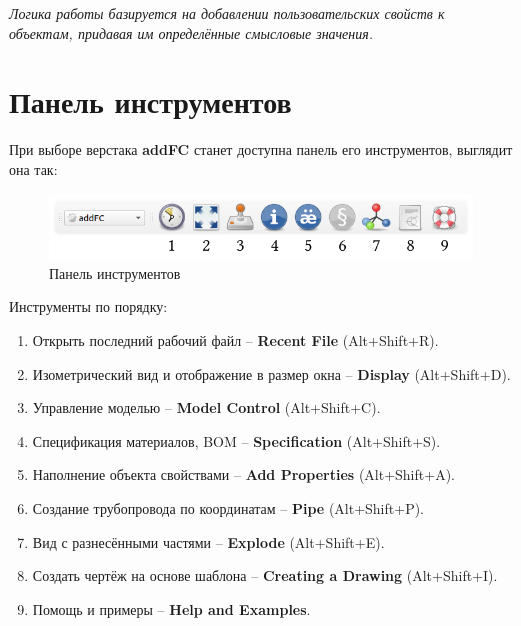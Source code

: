 \documentclass[a4paper,12pt]{article}
\begin{document}
\begin{center}\emph{Логика работы базируется на добавлении пользовательских свойств к объектам, придавая им определённые смысловые значения.}\end{center}





\section{Панель инструментов}

При выборе верстака \textbf{addFC} станет доступна панель его инструментов, выглядит она так:

\begin{figure}[htp]
	\centering
	\includegraphics[scale=0.8]{img/toolbar.png}
	\caption{Панель инструментов}
	\label{sec:toolbar}
\end{figure}

\begin{flushleft}Инструменты по порядку:\end{flushleft}
\begin{enumerate}
	\item Открыть последний рабочий файл -- \textbf{Recent File} (Alt+Shift+R).\label{sec:1}
	\item Изометрический вид и отображение в размер окна -- \textbf{Display} (Alt+Shift+D).\label{sec:2}
	\item Управление моделью -- \textbf{Model Control} (Alt+Shift+C).\label{sec:3}
	\item Спецификация материалов, BOM -- \textbf{Specification} (Alt+Shift+S).\label{sec:4}
	\item Наполнение объекта свойствами -- \textbf{Add Properties} (Alt+Shift+A).\label{sec:5}
	\item Создание трубопровода по координатам -- \textbf{Pipe} (Alt+Shift+P).\label{sec:6}
	\item Вид с разнесёнными частями -- \textbf{Explode} (Alt+Shift+E).\label{sec:7}
	\item Создать чертёж на основе шаблона -- \textbf{Creating a Drawing} (Alt+Shift+I).\label{sec:8}
	\item Помощь и примеры -- \textbf{Help and Examples}.\label{sec:9}
\end{enumerate}
\end{document}
